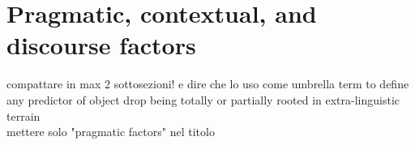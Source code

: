 



\section{Pragmatic, contextual, and discourse factors} 

compattare in max 2 sottosezioni! e dire che lo uso come umbrella term to define any predictor of object drop being totally or partially rooted in extra-linguistic terrain\\

mettere solo "pragmatic factors" nel titolo


